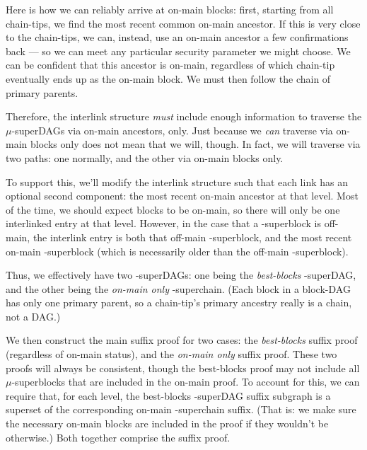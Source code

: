 
Here is how we can reliably arrive at on-main blocks:
first, starting from all chain-tips, we find the most recent common on-main ancestor.
If this is very close to the chain-tips, we can, instead, use an on-main ancestor a few confirmations back --- so we can meet any particular security parameter we might choose.
We can be confident that this ancestor is on-main, regardless of which chain-tip eventually ends up as the on-main block.
We must then follow the chain of primary parents.

Therefore, the interlink structure \emph{must} include enough information to traverse the $\mu$-superDAGs via on-main ancestors, only.
Just because we \emph{can} traverse via on-main blocks only does not mean that we will, though.
In fact, we will traverse via two paths: one normally, and the other via on-main blocks only.

To support this, we'll modify the interlink structure such that each link has an optional second component: the most recent on-main ancestor at that \mu level.
Most of the time, we should expect blocks to be on-main, so there will only be one interlinked entry at that \mu level.
However, in the case that a \mu-superblock is off-main, the interlink entry is both that off-main \mu-superblock, and the most recent on-main \mu-superblock (which is necessarily older than the off-main \mu-superblock).

Thus, we effectively have two \mu-superDAGs: one being the \emph{best-blocks} \mu-superDAG, and the other being the \emph{on-main only} \mu-superchain.
(Each block in a block-DAG has only one primary parent, so a chain-tip's primary ancestry really is a chain, not a DAG.)

We then construct the main suffix proof for two cases: the \emph{best-blocks} suffix proof (regardless of on-main status), and the \emph{on-main only} suffix proof.
These two proofs will always be consistent, though the best-blocks proof may not include all $\mu$-superblocks that are included in the on-main proof.
To account for this, we can require that, for each \mu level, the best-blocks \mu-superDAG suffix subgraph is a superset of the corresponding on-main \mu-superchain suffix.
(That is: we make sure the necessary on-main blocks are included in the proof if they wouldn't be otherwise.)
Both together comprise the suffix proof.

